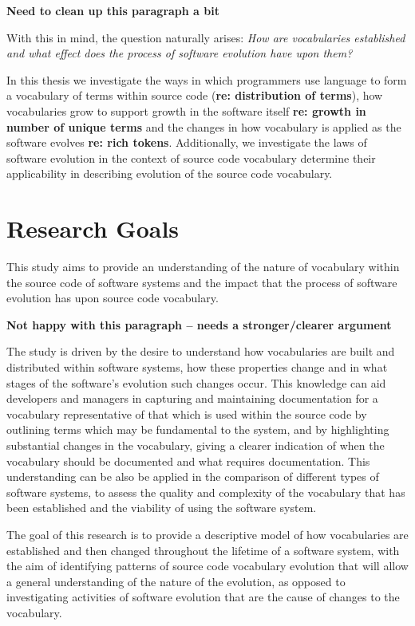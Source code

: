 \textbf{Need to clean up this paragraph a bit}

With this in mind, the question naturally arises: \emph{How are vocabularies established and what effect does the process of software evolution have upon them?}

In this thesis we investigate the ways in which programmers use language to form a vocabulary of terms within source code (\textbf{re: distribution of terms}), how vocabularies grow to support growth in the software itself \textbf{re: growth in number of unique terms} and the changes in how vocabulary is applied as the software evolves \textbf{re: rich tokens}. Additionally, we investigate the laws of software evolution in the context of source code vocabulary determine their applicability in describing evolution of the source code vocabulary.

\section{Research Goals} %
\label{sec:research_goals}

This study aims to provide an understanding of the nature of vocabulary within the source code of software systems and the impact that the process of software evolution has upon source code vocabulary.

\textbf{Not happy with this paragraph -- needs a stronger/clearer argument}

The study is driven by the desire to understand how vocabularies are built and distributed within software systems, how these properties change and in what stages of the software's evolution such changes occur. This knowledge can aid developers and managers in capturing and maintaining documentation for a vocabulary representative of that which is used within the source code by outlining terms which may be fundamental to the system, and by highlighting substantial changes in the vocabulary, giving a clearer indication of when the vocabulary should be documented and what requires documentation. This understanding can be also be applied in the comparison of different types of software systems, to assess the quality and complexity of the vocabulary that has been established and the viability of using the software system.

The goal of this research is to provide a descriptive model of how vocabularies are established and then changed throughout the lifetime of a software system, with the aim of identifying patterns of source code vocabulary evolution that will allow a general understanding of the nature of the evolution, as opposed to investigating activities of software evolution that are the cause of changes to the vocabulary.

